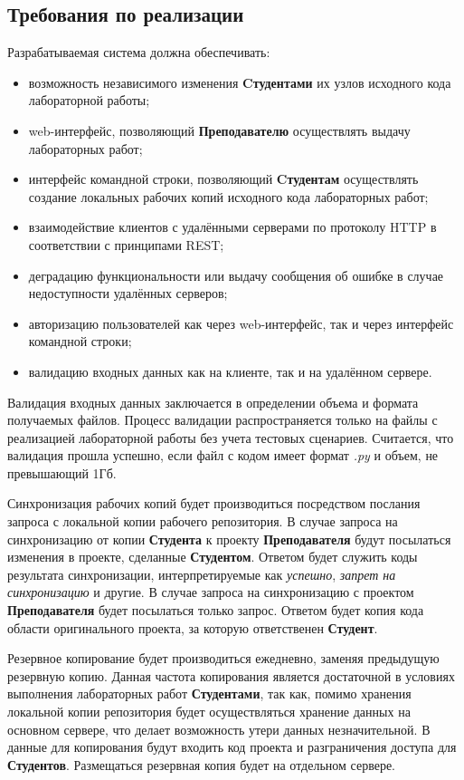 \documentclass{bmstu}
\begin{document}
  \subsection{Требования по реализации}

  Разрабатываемая система должна обеспечивать:
  \begin{itemize}[label=---]
    \item возможность независимого изменения \textbf{Cтудентами} их узлов
      исходного кода лабораторной работы;
    \item web-интерфейс, позволяющий \textbf{Преподавателю} осуществлять выдачу
      лабораторных работ;
    \item интерфейс командной строки, позволяющий \textbf{Cтудентам}
      осуществлять создание локальных рабочих копий исходного кода
      лабораторных работ;
    \item взаимодействие клиентов с удалёнными серверами по протоколу
      HTTP в соответствии с принципами REST;
    \item деградацию функциональности или выдачу сообщения об ошибке в
      случае недоступности удалённых серверов;
    \item авторизацию пользователей как через web-интерфейс, так и
      через интерфейс командной строки;
    \item валидацию входных данных как на клиенте, так и на удалённом
      сервере.
  \end{itemize}
  
  Валидация входных данных заключается в определении объема и формата получаемых файлов.
  Процесс валидации распространяется только на файлы с реализацией лабораторной работы без учета тестовых сценариев.
  Считается, что валидация прошла успешно, если файл с кодом имеет формат \textit{.py} и объем, не превышающий 1Гб.

  Синхронизация рабочих копий будет производиться посредством послания запроса с
  локальной копии рабочего репозитория. В случае запроса на синхронизацию
  от копии \textbf{Студента} к проекту \textbf{Преподавателя} будут посылаться изменения 
  в проекте, сделанные \textbf{Студентом}. Ответом будет служить коды результата 
  синхронизации, интерпретируемые как \textit{успешно}, \textit{запрет на синхронизацию} и другие.
  В случае запроса на синхронизацию с проектом \textbf{Преподавателя} будет посылаться
  только запрос. Ответом будет копия кода области оригинального проекта, 
  за которую ответственен \textbf{Студент}. 

  Резервное копирование будет производиться ежедневно, заменяя предыдущую резервную копию. 
  Данная частота копирования является достаточной в условиях выполнения лабораторных 
  работ \textbf{Студентами}, так как, помимо хранения локальной копии репозитория
  будет осуществляться хранение данных на основном сервере, что делает возможность
  утери данных незначительной. 
  В данные для копирования будут входить код проекта и разграничения доступа для
  \textbf{Студентов}. Размещаться резервная копия будет на отдельном сервере.
\end{document}
